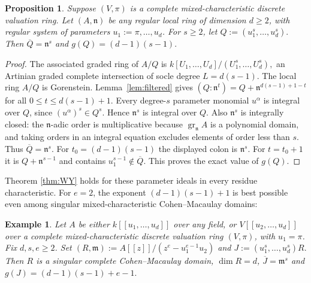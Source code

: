 \documentclass[11pt,a4paper]{amsart}
\numberwithin{equation}{section}
\newtheorem{proposition}[theorem]{Proposition}
\newtheorem{example}[theorem]{Example}\newtheorem{notation}[theorem]{Notation}
\newcommand{\m}{\mathfrak m}
\newcommand{\n}{\mathfrak n}
\newcommand{\ol}[1]{\overline{#1}}
\newcommand{\gr}{\operatorname{gr}}
\begin{document}
 
 
 \begin{proposition} 
 	\label{prop:regular}
 	Suppose $(V,\pi)$ is a  complete mixed-characteristic discrete
 	valuation ring. 	Let $(A,\n)$ be any regular local ring of dimension $d\geq2$,
 	with regular system of parameters $u_1:=\pi,\ldots,u_d$.
 	For $s\geq2$, let
 	$	Q:=(u_1^s,\ldots,u_d^s).$ 
 	Then
 	$\ol Q=\n^s$ and
 	$g(Q)=(d-1)(s-1). $
 	
 \end{proposition}
 \begin{proof}
 	The associated graded ring of $A/Q$ is
 	$ k[U_1,\ldots,U_d]/(U_1^s,\ldots,U_d^s), $
 	an Artinian graded complete intersection of socle degree
 	$L=d(s-1)$.  The local ring $A/Q$ is Gorenstein.
 	Lemma~\ref{lem:filtered} gives
 	$
 	(Q:\n^t)=Q+\n^{d(s-1)+1-t}$ for all $0\leq t\leq d(s-1)+1.$
 	Every degree-$s$ parameter monomial $u^\alpha$ is integral over
 	$Q$, since $(u^\alpha)^s\in Q^s$.  Hence $\n^s$ is integral
 	over $Q$.
 	Also $\n^s$ is integrally closed: the $\n$-adic order is
 	multiplicative because $\gr_\n A$ is a polynomial domain,
 	and taking orders in an integral equation excludes elements
 	of order less than $s$.  Thus $\ol Q=\n^s$.
 	For $t_0=(d-1)(s-1)$ the displayed colon is $\n^s$.
 	For $t=t_0+1$ it is $Q+\n^{s-1}$ and contains
 	$u_1^{s-1}\notin\ol Q$.
 	This proves the exact value of $g(Q)$.
 \end{proof}
 Theorem \ref{thm:WY} holds for these parameter ideals in every
 residue characteristic.  For $e=2$, the exponent
 $(d-1)(s-1)+1$ is best possible even among singular
 mixed-characteristic Cohen--Macaulay domains:
 \begin{example}
 	\label{hypersurface}
 	Let $A$ be either $k[[u_1,\ldots,u_d]]$ over any field,
 	or $V[[u_2,\ldots,u_d]]$ over a complete mixed-characteristic
 	discrete valuation ring $(V,\pi)$, with $u_1=\pi$.  Fix $d,s,e\geq2$.
 	Set
 	$(R,\m):=A[[z]]/(z^e-u_1^{e-1}u_2)$ and 
 	$J:=(u_1^s,\ldots,u_d^s)R. $
 	Then $R$ is a singular complete Cohen--Macaulay  domain,
 	$\dim R=d$,  
 	$ \ol J=\m^s$ and
 	$	g(J)=(d-1)(s-1)+e-1. $
 	
 \end{example}
\end{document}

